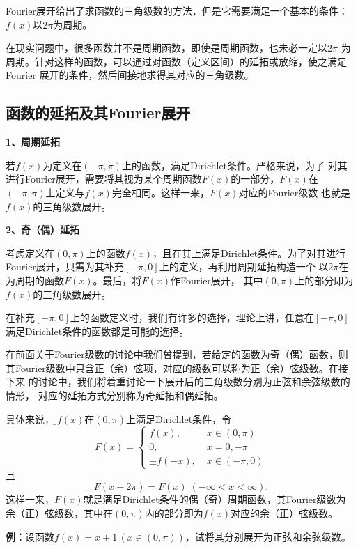 Fourier展开给出了求函数的三角级数的方法，但是它需要满足一个基本的条件：
$f(x)$以$2\pi$为周期。

在现实问题中，很多函数并不是周期函数，即使是周期函数，也未必一定以$2\pi$
为周期。针对这样的函数，可以通过对函数（定义区间）的延拓或放缩，使之满足Fourier
展开的条件，然后间接地求得其对应的三角级数。

\subsection{函数的延拓及其Fourier展开}

{\bf 1、周期延拓}

若$f(x)$为定义在$(-\pi,\pi)$上的函数，满足Dirichlet条件。严格来说，为了
对其进行Fourier展开，需要将其视为某个周期函数$F(x)$的一部分，$F(x)$在
$(-\pi,\pi)$上定义与$f(x)$完全相同。这样一来，$F(x)$对应的Fourier级数
也就是$f(x)$的三角级数展开。

{\bf 2、奇（偶）延拓}

考虑定义在$(0,\pi)$上的函数$f(x)$，且在其上满足Dirichlet条件。为了对其进行
Fourier展开，只需为其补充$[-\pi,0]$上的定义，再利用周期延拓构造一个
以$2\pi$在为周期的函数$F(x)$。最后，将$F(x)$作Fourier展开，
其中$(0,\pi)$上的部分即为$f(x)$的三角级数展开。

在补充$[-\pi,0]$上的函数定义时，我们有许多的选择，理论上讲，任意在$[-\pi,0]$
满足Dirichlet条件的函数都是可能的选择。

在前面关于Fourier级数的讨论中我们曾提到，若给定的函数为奇（偶）函数，则
其Fourier级数中只含正（余）弦项，对应的级数可以称为正（余）弦级数。在接下来
的讨论中，我们将着重讨论一下展开后的三角级数分别为正弦和余弦级数的情形，
对应的延拓方式分别称为奇延拓和偶延拓。

具体来说，{\b 设$f(x)$在$(0,\pi)$上满足Dirichlet条件，令
$$F(x)=\left\{\begin{array}{ll}
  	f(x),\;& x\in(0,\pi)\\
  	0,\;& x=0,-\pi\\
  	\pm f(-x),\;& x\in(-\pi,0)
  \end{array}\right.$$
且
  $$F(x+2\pi)=F(x)\;(-\infty<x<\infty).$$
这样一来，$F(x)$就是满足Dirichlet条件的偶（奇）周期函数，其Fourier级数为
余（正）弦级数，其中在$(0,\pi)$内的部分即为$f(x)$对应的余（正）弦级数。}

{\bf 例：}设函数$f(x)=x+1\,(x\in(0,\pi))$，试将其分别展开为正弦和余弦级数。

